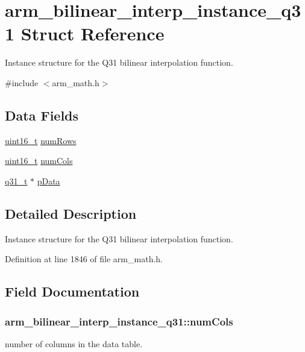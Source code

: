 \hypertarget{structarm__bilinear__interp__instance__q31}{\section{arm\-\_\-bilinear\-\_\-interp\-\_\-instance\-\_\-q31 Struct Reference}
\label{structarm__bilinear__interp__instance__q31}
}


Instance structure for the Q31 bilinear interpolation function.  




{\ttfamily \#include $<$arm\-\_\-math.\-h$>$}

\subsection*{Data Fields}
\begin{DoxyCompactItemize}
\item 
\hyperlink{stdint_8h_a273cf69d639a59973b6019625df33e30}{uint16\-\_\-t} \hyperlink{structarm__bilinear__interp__instance__q31_a2082e3eac56354d75291f03e96ce4aa5}{num\-Rows}
\item 
\hyperlink{stdint_8h_a273cf69d639a59973b6019625df33e30}{uint16\-\_\-t} \hyperlink{structarm__bilinear__interp__instance__q31_a6c3eff4eb17ff1d43f170efb84713a2d}{num\-Cols}
\item 
\hyperlink{arm__math_8h_adc89a3547f5324b7b3b95adec3806bc0}{q31\-\_\-t} $\ast$ \hyperlink{structarm__bilinear__interp__instance__q31_a843eae0c9db5f815e77e1aaf9afea358}{p\-Data}
\end{DoxyCompactItemize}


\subsection{Detailed Description}
Instance structure for the Q31 bilinear interpolation function. 

Definition at line 1846 of file arm\-\_\-math.\-h.



\subsection{Field Documentation}
\hypertarget{structarm__bilinear__interp__instance__q31_a6c3eff4eb17ff1d43f170efb84713a2d}{
\subsubsection[{num\-Cols}]{ arm\-\_\-bilinear\-\_\-interp\-\_\-instance\-\_\-q31\-::num\-Cols}}\label{structarm__bilinear__interp__instance__q31_a6c3eff4eb17ff1d43f170efb84713a2d}
number of columns in the data table. 

